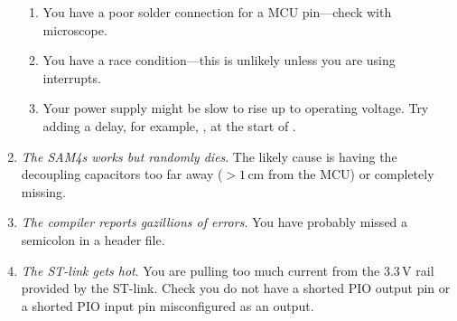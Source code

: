 \begin{enumerate}
\begin{enumerate}
  \item You have a poor solder connection for a MCU pin---check with
    microscope.

  \item You have a race condition---this is unlikely unless you are
    using interrupts.

  \item Your power supply might be slow to rise up to operating
    voltage.  Try adding a delay, for example, ,
    at the start of .
  \end{enumerate}

\item \emph{The SAM4s works but randomly dies}. The likely cause is
  having the decoupling capacitors too far away ($> 1$\,cm from the
  MCU) or completely missing.

\item \emph{The compiler reports gazillions of errors}.  You have
  probably missed a semicolon in a header file.

\item \emph{The ST-link gets hot}.  You are pulling too much current
  from the 3.3\,V rail provided by the ST-link.  Check you do not have
  a shorted PIO output pin or a shorted PIO input pin misconfigured as
  an output.

\end{enumerate}
